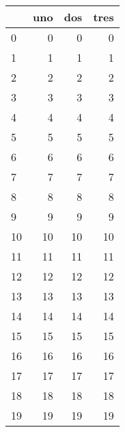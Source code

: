 \begin{tabular}{lrrr}
\toprule
{} &  uno &  dos &  tres \\
\midrule
0  &    0 &    0 &     0 \\
1  &    1 &    1 &     1 \\
2  &    2 &    2 &     2 \\
3  &    3 &    3 &     3 \\
4  &    4 &    4 &     4 \\
5  &    5 &    5 &     5 \\
6  &    6 &    6 &     6 \\
7  &    7 &    7 &     7 \\
8  &    8 &    8 &     8 \\
9  &    9 &    9 &     9 \\
10 &   10 &   10 &    10 \\
11 &   11 &   11 &    11 \\
12 &   12 &   12 &    12 \\
13 &   13 &   13 &    13 \\
14 &   14 &   14 &    14 \\
15 &   15 &   15 &    15 \\
16 &   16 &   16 &    16 \\
17 &   17 &   17 &    17 \\
18 &   18 &   18 &    18 \\
19 &   19 &   19 &    19 \\
\bottomrule
\end{tabular}
